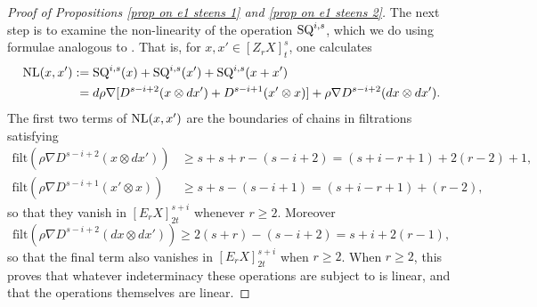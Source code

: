 \documentclass[11pt]{amsart} \renewcommand{\baselinestretch}{1.2}
\theoremstyle{plain}
\numberwithin{equation}{section} %
\theoremstyle{plain}
\numberwithin{equation}{chapter} %
\newcommand{\Nabla}{\nabla}
\newcommand{\E}[5]{[E^{#1}_{#2}#3]^{#4}_{#5}}
\newcommand{\EZdownup}[5]{[Z^{#2}_{#1}#3]^{#4}_{#5}}
\newcommand{\filt}{\mathrm{filt}}
\begin{document}
\begin{second quadrant homotopy sseq operations}
\begin{proof}[Proof of Propositions \ref{prop on e1 steens 1} and \ref{prop on e1 steens 2}]
The next step is to examine the non-linearity of the operation $\textup{SQ}^{i,s}$, which we do using formulae analogous to \cite[(1.111) and (1.112)]{MR2245560}. That is, for $x,x'\in \EZdownup{r}{}{X}{s}{t}$, one calculates
\begin{alignat*}{2}
\textup{NL}(x,x'){}:={}&  \textup{SQ}^{i,s}(x)+\textup{SQ}^{i,s}(x')+\textup{SQ}^{i,s}(x+x') 
\\
{}={}&d\rho\Nabla [D^{s-i+2}(x\otimes dx')+D^{s-i+1}(x'\otimes x)]+\rho\Nabla D^{s-i+2}(dx\otimes dx') .
\end{alignat*}
%
The first two terms of $\textup{NL}(x,x')$ are the boundaries of chains in filtrations satisfying
\begin{align*}
\filt(\rho\Nabla D^{s-i+2}(x\otimes dx'))&\geq s+s+r-(s-i+2)=(s+i-r+1)+2(r-2)+1,\\
\filt(\rho\Nabla D^{s-i+1}(x'\otimes x))&\geq s+s-(s-i+1)=(s+i-r+1)+(r-2),
\end{align*}
so that they vanish in $\E{}{r}{X}{s+i}{2t}$ whenever $r\geq2$. Moreover
\[\filt(\rho\Nabla D^{s-i+2}(dx\otimes dx'))\geq 2(s+r)-(s-i+2)=s+i+2(r-1),\]
so that the final term also vanishes in $\E{}{r}{X}{s+i}{2t}$ when $r\geq2$.  When $r\geq2$, this proves that  whatever indeterminacy these operations are subject to is linear, and that the operations themselves are linear.


\end{proof}
\end{second quadrant homotopy sseq operations}
\end{document}
